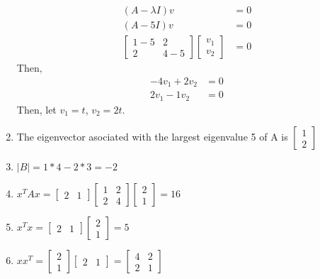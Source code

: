 \documentclass[11pt]{scrartcl}
\begin{document}
\begin{enumerate}
\begin{align*}
(A - \lambda I) v &= 0 \\
(A - 5I) v &= 0 \\
\begin{bmatrix} 1 - 5 & 2 \\ 2 & 4 - 5 \end{bmatrix} \begin{bmatrix} v_1 \\ v_2 \end{bmatrix} &= 0
\end{align*}
Then,
\begin{align*}
-4v_1 + 2v_2 &= 0 \\
2v_1 -1v_2 &= 0
\end{align*}
Then, let $v_1 = t$, $v_2 = 2t$.
\item The eigenvector asociated with the largest eigenvalue 5 of A is $\begin{bmatrix}1 \\ 2\end{bmatrix}$

\item $|B| = 1*4 - 2*3 = -2$

\item $x^T Ax = \begin{bmatrix} 2 & 1 \end{bmatrix} \begin{bmatrix} 1 & 2 \\ 2 & 4 \end{bmatrix} \begin{bmatrix} 2 \\ 1 \end{bmatrix} = 16$

\item $x^T x = \begin{bmatrix} 2 & 1 \end{bmatrix} \begin{bmatrix} 2 \\ 1 \end{bmatrix} = 5$

\item $x x^T = \begin{bmatrix} 2 \\ 1 \end{bmatrix} \begin{bmatrix} 2 & 1 \end{bmatrix} = \begin{bmatrix} 4 & 2 \\ 2 & 1 \end{bmatrix}$


\end{enumerate}
\end{document}
